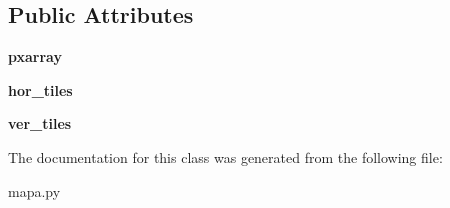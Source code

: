 \subsection*{Public Attributes}
\begin{DoxyCompactItemize}
\item 
\mbox{\label{classmapa_1_1_map_a85195facd1802a1ed033fc24b5e91750}} 
{\bfseries pxarray}
\item 
\mbox{\label{classmapa_1_1_map_a5f5c28e462473acc27a0bfc5542507ce}} 
{\bfseries hor\+\_\+tiles}
\item 
\mbox{\label{classmapa_1_1_map_a8800e6cbddda7596a8b3b4b7e9170336}} 
{\bfseries ver\+\_\+tiles}
\end{DoxyCompactItemize}


The documentation for this class was generated from the following file\+:\begin{DoxyCompactItemize}
\item 
mapa.\+py\end{DoxyCompactItemize}
